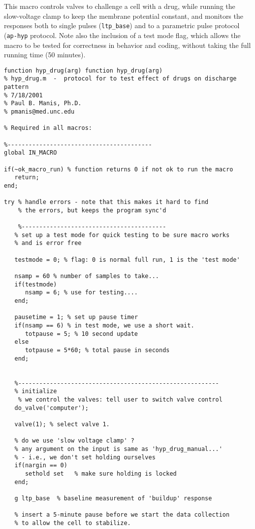 \documentclass[11pt, letterpaper, titlepage]{paper}
\begin{document}
This macro controls valves to challenge a cell with a drug, while 
running the slow-voltage clamp to keep the membrane potential 
constant, and monitors the responses both to single pulses 
(\texttt{ltp\_base}) and to a parametric pulse protocol 
(\texttt{ap-hyp} protocol. Note also the inclusion of a test mode 
flag, which allows the macro to be tested for correctness in 
behavior and coding, without taking the full running time (50 
minutes).
\begin{verbatim}
function hyp_drug(arg) function hyp_drug(arg)
% hyp_drug.m  -  protocol for to test effect of drugs on discharge pattern
% 7/18/2001
% Paul B. Manis, Ph.D.
% pmanis@med.unc.edu

% Required in all macros:

%-----------------------------------------
global IN_MACRO

if(~ok_macro_run) % function returns 0 if not ok to run the macro
   return;
end;

try % handle errors - note that this makes it hard to find 
    % the errors, but keeps the program sync'd
   
    %-----------------------------------------
   % set up a test mode for quick testing to be sure macro works
   % and is error free
   
   testmode = 0; % flag: 0 is normal full run, 1 is the 'test mode'
   
   nsamp = 60 % number of samples to take...
   if(testmode)
      nsamp = 6; % use for testing....
   end;
   
   pausetime = 1; % set up pause timer
   if(nsamp == 6) % in test mode, we use a short wait.
      totpause = 5; % 10 second update
   else
      totpause = 5*60; % total pause in seconds
   end;
   
   
   %---------------------------------------------------------
   % initialize
    % we control the valves: tell user to switch valve control
   do_valve('computer');
   
   valve(1); % select valve 1.
   
   % do we use 'slow voltage clamp' ?
   % any argument on the input is same as 'hyp_drug_manual...' 
   % - i.e., we don't set holding ourselves
   if(nargin == 0) 
      sethold set   % make sure holding is locked 
   end;
   
   g ltp_base  % baseline measurement of 'buildup' response
      
   % insert a 5-minute pause before we start the data collection
   % to allow the cell to stabilize.
   

\end{verbatim}
\end{document}
